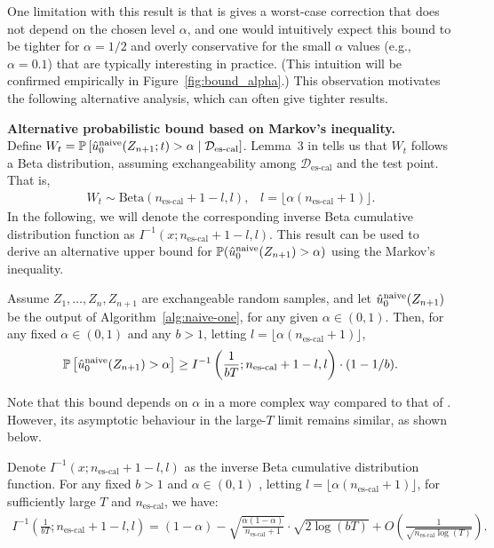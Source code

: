 One limitation with this result is that is gives a worst-case correction that does not depend on the chosen level $\alpha$, and one would intuitively expect this bound to be tighter for $\alpha = 1/2$ and overly conservative for the small $\alpha$ values (e.g., $\alpha = 0.1$) that are typically interesting in practice. (This intuition will be confirmed empirically in Figure~\ref{fig:bound_alpha}.)
This observation motivates the following alternative analysis, which can often give tighter results.


\noindent \textbf{Alternative probabilistic bound based on Markov's inequality.}\\
Define $W_t=\P{\hat{u}_0^{\textup{naive}}(Z_{n+1};t) > \alpha \mid \mathcal{D}_{\text{es-cal}}}$. Lemma~3 in \citet{vovk2012conditional} tells us that $W_t$ follows a Beta distribution, assuming exchangeability among $\mathcal{D}_{\text{es-cal}}$ and the test point. That is,
\begin{align*}
    W_t \sim \text{Beta}(n_{\text{es-cal}}+1-l, l), \hspace{10pt} l=\lfloor \alpha(n_{\text{es-cal}}+1) \rfloor.
\end{align*}
In the following, we will denote the corresponding inverse Beta cumulative distribution function as $I^{-1}(x;n_{\text{es-cal}}+1-l,l)$.
This result can be used to derive an alternative upper bound for $\mathbb{P}(\hat{u}_0^{\textup{naive}}(Z_{n+1}) > \alpha)$ using the Markov's inequality.

\begin{proposition}\label{prop:naive-od}
    Assume $Z_{1}, \ldots, Z_{n}, Z_{n+1}$ are exchangeable random samples, and let $\hat{u}^{\textup{naive}}_0(Z_{n+1})$ be the output of Algorithm~\ref{alg:naive-one}, for any given $\alpha \in (0,1)$. 
Then, for any fixed $\alpha \in (0,1)$ and any $b>1$, letting $l=\lfloor \alpha(n_{\text{es-cal}}+1)  \rfloor$,
$$\P{\hat{u}^{\textup{naive}}_0(Z_{n+1}) > \alpha} \geq I^{-1}\left( \frac{1}{bT};n_{\text{es-cal}}+1-l,l \right) \cdot (1-1/b).$$
\end{proposition}

Note that this bound depends on $\alpha$ in a more complex way compared to that of \citet{efficiency_first_cp}. 
However, its asymptotic behaviour in the large-$T$ limit remains similar, as shown below.

\begin{lemma}\label{lemma:asymp}
Denote $I^{-1}(x;n_{\text{es-cal}}+1-l,l)$ as the inverse Beta cumulative distribution function. For any fixed $b > 1$ and $\alpha \in (0,1)$ , letting $l=\lfloor \alpha(n_{\text{es-cal}}+1) \rfloor$, for sufficiently large $T$ and $n_{\text{es-cal}}$, we have:
\begin{align*}
    I^{-1}\left( \frac{1}{bT};n_{\text{es-cal}}+1-l,l \right) = (1-\alpha) - \sqrt{\frac{\alpha(1-\alpha)}{n_{\text{es-cal}}+1}}\cdot \sqrt{2\log(bT)} + O\left( \frac{1}{\sqrt{n_{\text{es-cal}}\log(T)}} \right).
\end{align*}

\end{lemma}

